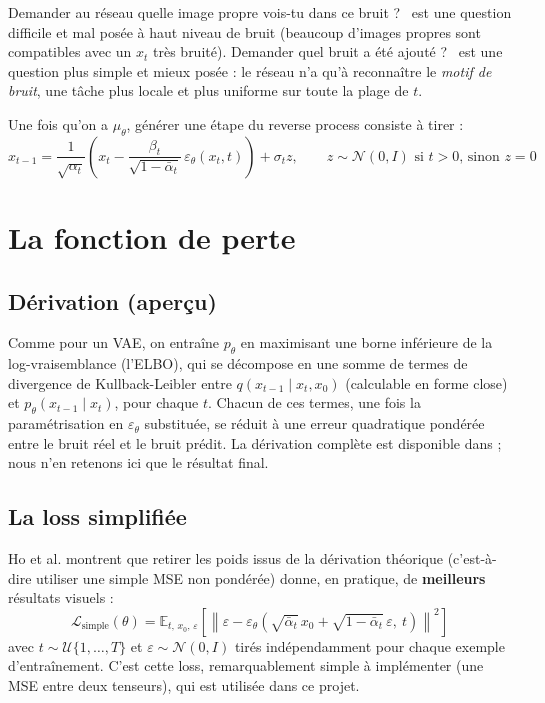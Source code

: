 \begin{intuition}
Demander au réseau \og quelle image propre vois-tu dans ce bruit ? \fg\ est une question difficile et
mal posée à haut niveau de bruit (beaucoup d'images propres sont compatibles avec un $x_t$ très
bruité). Demander \og quel bruit a été ajouté ? \fg\ est une question plus simple et mieux posée :
le réseau n'a qu'à reconnaître le \emph{motif de bruit}, une tâche plus locale et plus uniforme sur
toute la plage de $t$.
\end{intuition}

Une fois qu'on a $\mu_\theta$, générer une étape du reverse process consiste à tirer :
\begin{equation}
    \label{eq:psample}
    x_{t-1} = \frac{1}{\sqrt{\alpha_t}}\left(x_t - \frac{\beta_t}{\sqrt{1-\bar\alpha_t}}\,\varepsilon_\theta(x_t, t)\right) + \sigma_t z, \qquad z \sim \mathcal{N}(0, I) \text{ si } t>0 \text{, sinon } z=0
\end{equation}

\section{La fonction de perte}

\subsection{Dérivation (aperçu)}

Comme pour un VAE, on entraîne $p_\theta$ en maximisant une borne inférieure de la log-vraisemblance
(l'ELBO), qui se décompose en une somme de termes de divergence de Kullback-Leibler entre
$q(x_{t-1}\mid x_t, x_0)$ (calculable en forme close) et $p_\theta(x_{t-1}\mid x_t)$, pour chaque $t$.
Chacun de ces termes, une fois la paramétrisation en $\varepsilon_\theta$ substituée, se réduit à une
erreur quadratique pondérée entre le bruit réel et le bruit prédit. La dérivation complète est
disponible dans \cite{ho2020ddpm} ; nous n'en retenons ici que le résultat final.

\subsection{La loss simplifiée}

Ho et al. montrent que retirer les poids issus de la dérivation théorique (c'est-à-dire utiliser une
simple MSE non pondérée) donne, en pratique, de \textbf{meilleurs} résultats visuels :
\begin{equation}
    \boxed{\mathcal{L}_{\text{simple}}(\theta) = \mathbb{E}_{t,\, x_0,\, \varepsilon}\left[\left\lVert \varepsilon - \varepsilon_\theta\!\left(\sqrt{\bar\alpha_t}\,x_0 + \sqrt{1-\bar\alpha_t}\,\varepsilon,\ t\right) \right\rVert^2\right]}
\end{equation}
avec $t \sim \mathcal{U}\{1,\dots,T\}$ et $\varepsilon \sim \mathcal{N}(0,I)$ tirés indépendamment pour
chaque exemple d'entraînement. C'est cette loss, remarquablement simple à implémenter (une MSE entre
deux tenseurs), qui est utilisée dans ce projet.

